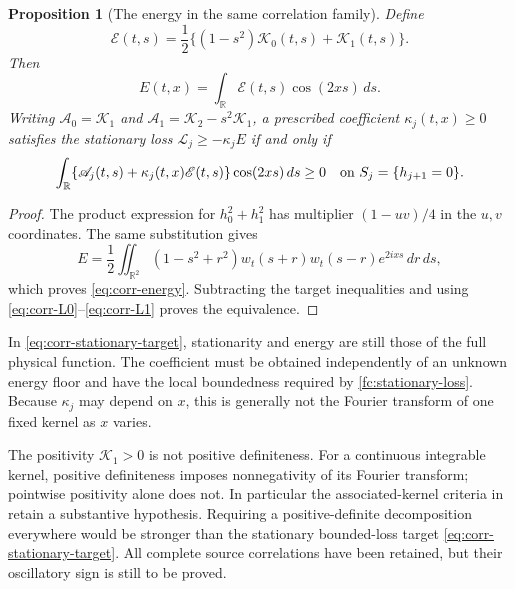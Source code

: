 \documentclass[11pt]{article}
\numberwithin{equation}{section}
\newtheorem{proposition}[theorem]{Proposition}
\theoremstyle{definition}
\theoremstyle{remark}
\newcommand{\R}{\mathbb R}
\newcommand{\dd}{\,d}
\newcommand{\Lag}{\mathcal L}
\begin{document}
\begin{proposition}[The energy in the same correlation family]
\label{prop:correlation-energy}
Define
\begin{equation}
 \mathscr E(t,s)=\frac12
       \{(1-s^2)\mathscr K_0(t,s)+\mathscr K_1(t,s)\}.
 \label{eq:corr-energy-kernel}
\end{equation}
Then
\begin{equation}
 E(t,x)=\int_{\R}\mathscr E(t,s)\cos(2xs)\dd s.
 \label{eq:corr-energy}
\end{equation}
Writing
\(\mathscr A_0=\mathscr K_1\) and
\(\mathscr A_1=\mathscr K_2-s^2\mathscr K_1\), a prescribed
coefficient \(\kappa_j(t,x)\ge0\) satisfies the stationary loss
\(\Lag_j\ge-\kappa_jE\) if and only if
\begin{equation}
 \int_{\R}\{\mathscr A_j(t,s)+
       \kappa_j(t,x)\mathscr E(t,s)\}\cos(2xs)\dd s\ge0
       \quad\hbox{on }S_j=\{h_{j+1}=0\}.
 \label{eq:corr-stationary-target}
\end{equation}
\end{proposition}
\begin{proof}
The product expression for \(h_0^2+h_1^2\) has multiplier
\((1-uv)/4\) in the \(u,v\) coordinates.  The same substitution gives
\[
 E=\frac12\iint_{\R^2}
       (1-s^2+r^2)w_t(s+r)w_t(s-r)e^{2ixs}\dd r\dd s,
\]
which proves \eqref{eq:corr-energy}.  Subtracting the target
inequalities and using
\eqref{eq:corr-L0}--\eqref{eq:corr-L1} proves the equivalence.
\end{proof}

In \eqref{eq:corr-stationary-target}, stationarity and energy are
still those of the full physical function.  The coefficient must
be obtained independently of an unknown energy floor and have the
local boundedness required by \eqref{fc:stationary-loss}.
Because \(\kappa_j\) may depend on \(x\), this is generally not the
Fourier transform of one fixed kernel as \(x\) varies.

The positivity \(\mathscr K_1>0\) is not positive definiteness.
For a continuous integrable kernel, positive definiteness imposes
nonnegativity of its Fourier transform; pointwise positivity alone
does not.  In particular the associated-kernel criteria in
\cite{csordas} retain a substantive hypothesis.  Requiring a
positive-definite decomposition everywhere would be stronger than
the stationary bounded-loss target
\eqref{eq:corr-stationary-target}.  All complete source correlations
have been retained, but their oscillatory sign is still to be proved.
\end{document}
